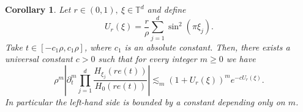 \documentclass{article}
\newcommand{\T}{\mathbb T}
\theoremstyle{plain}
\newtheorem{corollary}[theorem]{Corollary}
\numberwithin{equation}{section}
\begin{document}
\begin{corollary} \label{corllary:euclidean-product-derivatives}
    Let $r \in (0,1), \ \xi \in \T^d$ and define 
    \begin{equation} \label{eq: definition of U_r(xi)}
        U_r(\xi)= \frac{r}{\rho} \sum_{j=1}^d \sin^2(\pi \xi_j).
    \end{equation}
    Take $t \in [-c_1\rho, c_1\rho]$, where $c_1$ is an absolute constant. Then, there exists a universal constant $c>0$ such that for every integer $m\ge 0$ we have 
    \begin{equation*} 
        \rho^m\left|
 \partial_t^m
 \prod_{j=1}^d\frac{H_{\xi_j}(re(t))}{H_0(re(t))}
 \right|
 \lesssim_m(1+U_r(\xi))^m e^{-cU_r(\xi)}.
    \end{equation*}
    In particular the left-hand side is bounded by a constant depending only on $m$.
\end{corollary}
\end{document}
